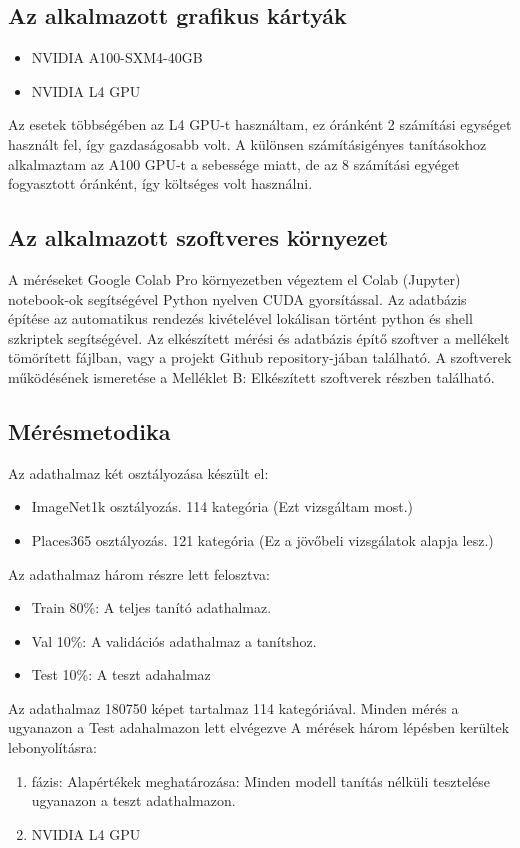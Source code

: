 \documentclass[]{elteikthesis}[2024/04/26]
\begin{document}
\subsection{Az alkalmazott grafikus kártyák}
\begin{itemize}
  \item NVIDIA A100-SXM4-40GB
  \item NVIDIA L4 GPU
\end{itemize}
Az esetek többségében az L4 GPU-t használtam, ez óránként 2 számítási egységet használt fel, így gazdaságosabb volt. A különsen számításigényes tanításokhoz alkalmaztam az A100 GPU-t a sebessége miatt, de az 8 számítási egyéget fogyasztott óránként, így költséges volt használni. 

\subsection{Az alkalmazott szoftveres környezet}
A méréseket Google Colab Pro környezetben végeztem el Colab (Jupyter) notebook-ok segítségével Python nyelven CUDA gyorsítással. Az adatbázis építése az automatikus rendezés kivételével lokálisan történt python és shell szkriptek segítségével. 
Az elkészített mérési és adatbázis építő szoftver a mellékelt tömörített fájlban, vagy a projekt Github repository-jában található.
A szoftverek működésének ismeretése a Melléklet B: Elkészített szoftverek részben található.

\subsection{Mérésmetodika}
Az adathalmaz két osztályozása készült el:
\begin{itemize}
  \item ImageNet1k osztályozás. 114 kategória (Ezt vizsgáltam most.)
  \item Places365 osztályozás.  121 kategória (Ez a jövőbeli vizsgálatok alapja lesz.)
\end{itemize}
Az adathalmaz három részre lett felosztva:
\begin{itemize}
  \item Train 80\%: A teljes tanító adathalmaz.
  \item Val   10\%: A validációs adathalmaz a tanítshoz.
  \item Test  10\%: A teszt adahalmaz
\end{itemize}
Az adathalmaz 180750 képet tartalmaz 114 kategóriával. 
Minden mérés a ugyanazon a Test adahalmazon lett elvégezve
A mérések három lépésben kerültek lebonyolításra:
\begin{enumerate}
  \item fázis: Alapértékek meghatározása: Minden modell tanítás nélküli tesztelése ugyanazon a teszt adathalmazon.
  \item NVIDIA L4 GPU
\end{enumerate}
\end{document}
